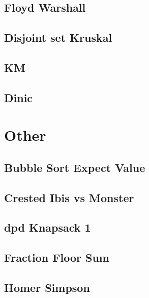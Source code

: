         \subsection{Floyd Warshall}
                
        \subsection{Disjoint set Kruskal}
                
        \subsection{KM}
                
        \subsection{Dinic}
                

\section{Other}
        \subsection{Bubble Sort Expect Value}
                
        \subsection{Crested Ibis vs Monster}
                
        \subsection{dpd Knapsack 1}
                
        \subsection{Fraction Floor Sum}
                
        \subsection{Homer Simpson}
                

